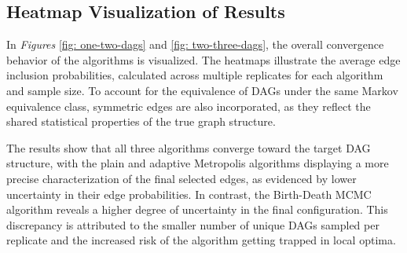 \documentclass{report}
\begin{document}
\subsection{Heatmap Visualization of Results}

In \textit{Figures} \ref{fig: one-two-dags} and \ref{fig: two-three-dags}, the overall convergence behavior of the algorithms is visualized. The heatmaps illustrate the average edge inclusion probabilities, calculated across multiple replicates for each algorithm and sample size. To account for the equivalence of DAGs under the same Markov equivalence class, symmetric edges are also incorporated, as they reflect the shared statistical properties of the true graph structure.

The results show that all three algorithms converge toward the target DAG structure, with the plain and adaptive Metropolis  algorithms displaying a more precise characterization of the final selected edges, as evidenced by lower uncertainty in their edge probabilities. In contrast, the Birth-Death MCMC algorithm reveals a higher degree of uncertainty in the final configuration. This discrepancy is attributed to the smaller number of unique DAGs sampled per replicate and the increased risk of the algorithm getting trapped in local optima. 
\end{document}
